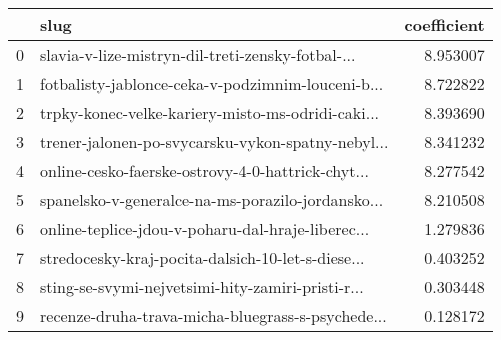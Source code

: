 \begin{tabular}{llr}
\toprule
{} &                                               slug &  coefficient \\
\midrule
0 &  slavia-v-lize-mistryn-dil-treti-zensky-fotbal-... &     8.953007 \\
1 &  fotbalisty-jablonce-ceka-v-podzimnim-louceni-b... &     8.722822 \\
2 &  trpky-konec-velke-kariery-misto-ms-odridi-caki... &     8.393690 \\
3 &  trener-jalonen-po-svycarsku-vykon-spatny-nebyl... &     8.341232 \\
4 &  online-cesko-faerske-ostrovy-4-0-hattrick-chyt... &     8.277542 \\
5 &  spanelsko-v-generalce-na-ms-porazilo-jordansko... &     8.210508 \\
6 &  online-teplice-jdou-v-poharu-dal-hraje-liberec... &     1.279836 \\
7 &  stredocesky-kraj-pocita-dalsich-10-let-s-diese... &     0.403252 \\
8 &  sting-se-svymi-nejvetsimi-hity-zamiri-pristi-r... &     0.303448 \\
9 &  recenze-druha-trava-micha-bluegrass-s-psychede... &     0.128172 \\
\bottomrule
\end{tabular}
